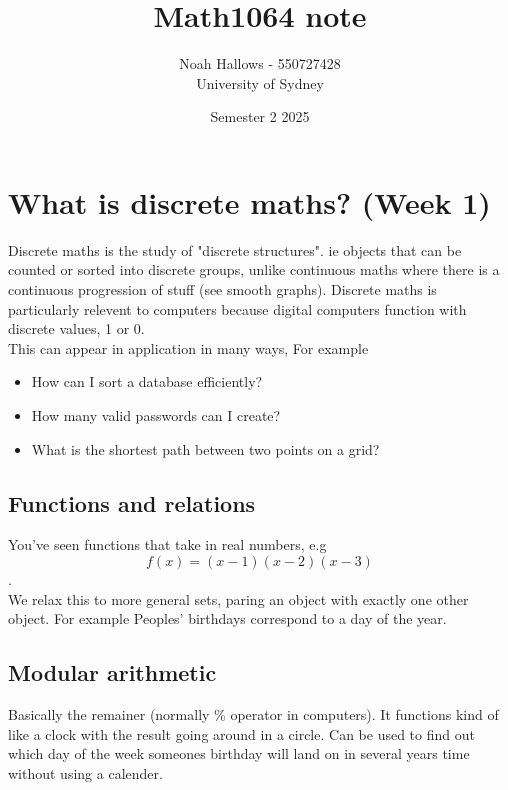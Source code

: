\documentclass[a4paper, 11pt]{report}
\title{Math1064 note \\ }
\author{Noah Hallows - 550727428 \\ University of Sydney}
\date{Semester 2 2025}
\begin{document}
    \begin{titlepage}
    \maketitle
    \end{titlepage}

    \tableofcontents

    \newpage
    \section{What is discrete maths? (Week 1)}
	Discrete maths is the study of "discrete structures". ie objects that can be counted or sorted into discrete groups, unlike continuous maths where there is a continuous progression of stuff (see smooth graphs). Discrete maths is particularly relevent to computers because digital computers function with discrete values, 1 or 0.\\
	This can appear in application in many ways, For example\\
	\begin{itemize}
		\item How can I sort a database efficiently?
		\item How many valid passwords can I create?
		\item What is the shortest path between two points on a grid?
	\end{itemize}
	\subsection{Functions and relations}
	You've seen functions that take in real numbers, e.g \[f(x) = (x-1)(x-2)(x-3)\]. \\
	We relax this to more general sets, paring an object with exactly one other object. For example Peoples' birthdays correspond to a day of the year.
	\subsection{Modular arithmetic}
	Basically the remainer (normally \% operator in computers). It functions kind of like a clock with the result going around in a circle. Can be used to find out which day of the week someones birthday will land on in several years time without using a calender.
\end{document}
